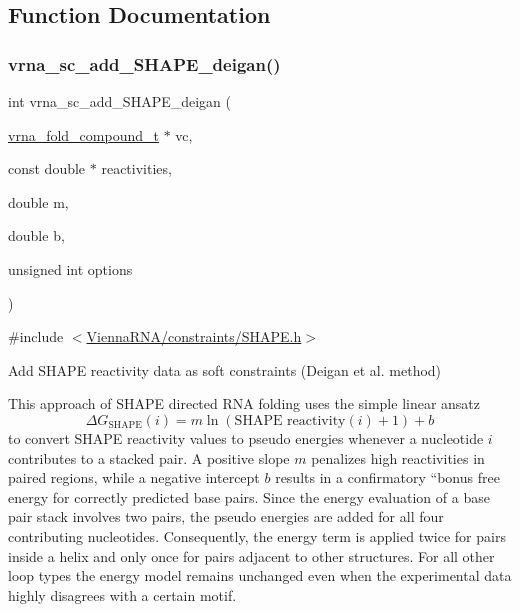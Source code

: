 \subsection{Function Documentation}
\mbox{\label{group__SHAPE__reactivities_ga57d612b58e1c61dd6cfcb5a843f8f1b3}} 
\subsubsection{\texorpdfstring{vrna\+\_\+sc\+\_\+add\+\_\+\+S\+H\+A\+P\+E\+\_\+deigan()}{vrna\_sc\_add\_SHAPE\_deigan()}}
{\footnotesize\ttfamily int vrna\+\_\+sc\+\_\+add\+\_\+\+S\+H\+A\+P\+E\+\_\+deigan (\begin{DoxyParamCaption}\item[{\hyperlink{group__fold__compound_ga1b0cef17fd40466cef5968eaeeff6166}{vrna\+\_\+fold\+\_\+compound\+\_\+t} $\ast$}]{vc,  }\item[{const double $\ast$}]{reactivities,  }\item[{double}]{m,  }\item[{double}]{b,  }\item[{unsigned int}]{options }\end{DoxyParamCaption})}



{\ttfamily \#include $<$\hyperlink{SHAPE_8h}{Vienna\+R\+N\+A/constraints/\+S\+H\+A\+P\+E.\+h}$>$}



Add S\+H\+A\+PE reactivity data as soft constraints (Deigan et al. method) 

This approach of S\+H\+A\+PE directed R\+NA folding uses the simple linear ansatz \[ \Delta G_{\text{SHAPE}}(i) = m \ln(\text{SHAPE reactivity}(i)+1)+ b \] to convert S\+H\+A\+PE reactivity values to pseudo energies whenever a nucleotide $ i $ contributes to a stacked pair. A positive slope $ m $ penalizes high reactivities in paired regions, while a negative intercept $ b $ results in a confirmatory ``bonus\textquotesingle{}\textquotesingle{} free energy for correctly predicted base pairs. Since the energy evaluation of a base pair stack involves two pairs, the pseudo energies are added for all four contributing nucleotides. Consequently, the energy term is applied twice for pairs inside a helix and only once for pairs adjacent to other structures. For all other loop types the energy model remains unchanged even when the experimental data highly disagrees with a certain motif.

